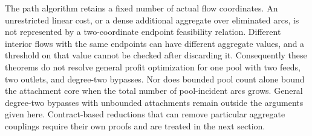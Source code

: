 The path algorithm retains a fixed number of actual flow coordinates.
An unrestricted linear cost, or a dense additional aggregate over
eliminated arcs, is not represented by a two-coordinate endpoint
feasibility relation. Different interior flows with the same endpoints
can have different aggregate values, and a threshold on that value
cannot be checked after discarding it. Consequently these theorems do
not resolve general profit optimization for one pool with two feeds,
two outlets, and degree-two bypasses. Nor does bounded pool count alone
bound the attachment core when the total number of pool-incident arcs
grows. General degree-two bypasses with unbounded attachments remain
outside the arguments given here. Contract-based reductions that can
remove particular aggregate couplings require their own proofs and
are treated in the next section.
